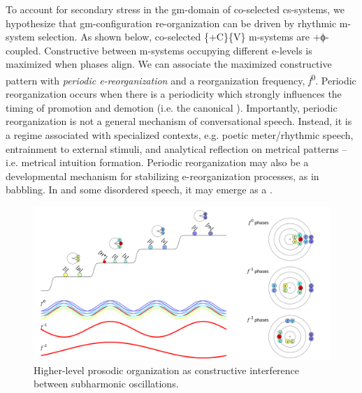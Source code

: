   To account for secondary stress in the gm-domain of co-selected cs-systems, we hypothesize that gm-con\-fig\-u\-ra\-tion re-organization can be driven by rhythmic m-sys\-tem selection. As shown below, co-selected \{+C\}\{V\} m-sys\-tems are +ϕ-coupled. Constructive  between m-sys\-tems occupying different e-levels is maximized when  phases align. We can associate the maximized constructive  pattern with \textit{periodic e-reorganization} and a reorganization frequency, \textit{f}\textsuperscript{0}. Periodic reorganization occurs when there is a periodicity which strongly influences the timing of promotion and demotion (i.e. the canonical ). Importantly, periodic reorganization is not a general mechanism of conversational speech. Instead, it is a regime associated with specialized contexts, e.g. poetic meter/rhythmic speech, entrainment to external stimuli, and analytical reflection on metrical patterns -- i.e. metrical intuition formation. Periodic reorganization may also be a developmental mechanism for stabilizing e-reorganization processes, as in babbling. In  and some disordered speech, it may emerge as a .

  
\begin{figure}
\includegraphics[width=\textwidth]{figures/Tilsen-img64.png}
\caption{Higher-level prosodic organization as constructive interference between subharmonic oscillations.}
\label{fig:4:14}
\end{figure}
 

